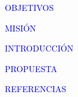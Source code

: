 \documentclass[12pt]{article}
\begin{document}
\textcolor{blue}{OBJETIVOS}
\par\vspace{1.5cm}
\textcolor{blue}{MISIÓN}
\par\vspace{1.5cm}
\textcolor{blue}{INTRODUCCIÓN}
\par\vspace{1.5cm}
\textcolor{blue}{PROPUESTA}
\par\vspace{1.5cm}
\textcolor{blue}{REFERENCIAS}
\end{document}
